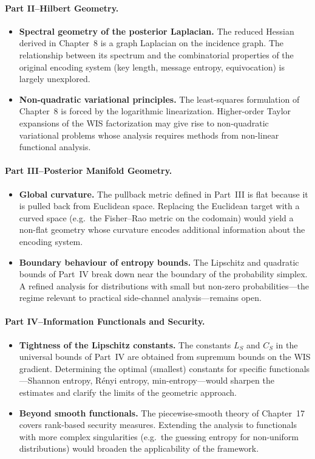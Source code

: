 \paragraph{Part II--Hilbert Geometry.}
\begin{itemize}
\item \textbf{Spectral geometry of the posterior Laplacian.}  The reduced Hessian derived in Chapter~8 is a graph Laplacian on the incidence graph.  The relationship between its spectrum and the combinatorial properties of the original encoding system (key length, message entropy, equivocation) is largely unexplored.
\item \textbf{Non-quadratic variational principles.}  The least-squares formulation of Chapter~8 is forced by the logarithmic linearization.  Higher-order Taylor expansions of the WIS factorization may give rise to non-quadratic variational problems whose analysis requires methods from non-linear functional analysis.
\end{itemize}
\paragraph{Part III--Posterior Manifold Geometry.}
\begin{itemize}
\item \textbf{Global curvature.}  The pullback metric defined in Part~III is flat because it is pulled back from Euclidean space.  Replacing the Euclidean target with a curved space (e.g.\ the Fisher--Rao metric on the codomain) would yield a non-flat geometry whose curvature encodes additional information about the encoding system.
\item \textbf{Boundary behaviour of entropy bounds.}  The Lipschitz and quadratic bounds of Part~IV break down near the boundary of the probability simplex.  A refined analysis for distributions with small but non-zero probabilities---the regime relevant to practical side-channel analysis---remains open.
\end{itemize}
\paragraph{Part IV--Information Functionals and Security.}
\begin{itemize}
\item \textbf{Tightness of the Lipschitz constants.}  The constants \(L_S\) and \(C_S\) in the universal bounds of Part~IV are obtained from supremum bounds on the WIS gradient.  Determining the optimal (smallest) constants for specific functionals---Shannon entropy, R\'enyi entropy, min-entropy---would sharpen the estimates and clarify the limits of the geometric approach.
\item \textbf{Beyond smooth functionals.}  The piecewise-smooth theory of Chapter~17 covers rank-based security measures.  Extending the analysis to functionals with more complex singularities (e.g.\ the guessing entropy for non-uniform distributions) would broaden the applicability of the framework.
\end{itemize}
